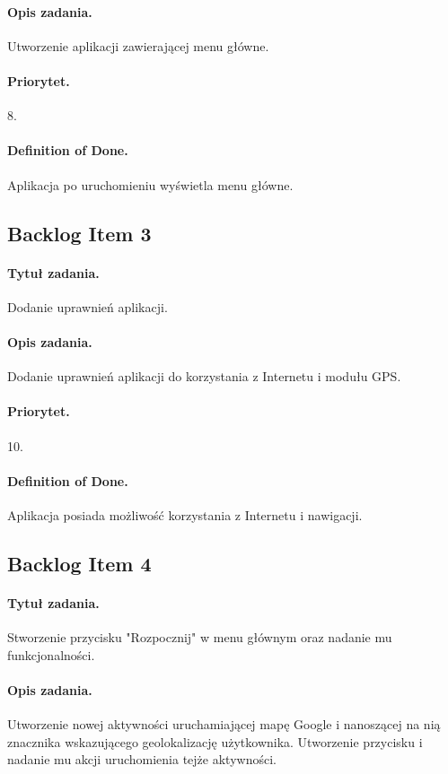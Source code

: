 \documentclass[a4paper]{article}
\begin{document}
\paragraph{Opis zadania.} Utworzenie aplikacji zawierającej menu główne.
\paragraph{Priorytet.} 8.
\paragraph{Definition of Done.} Aplikacja po uruchomieniu wyświetla menu główne.

\subsection{Backlog Item 3}
\paragraph{Tytuł zadania.} Dodanie uprawnień aplikacji.
\paragraph{Opis zadania.} Dodanie uprawnień aplikacji do korzystania z Internetu i modułu GPS.
\paragraph{Priorytet.} 10.
\paragraph{Definition of Done.} Aplikacja posiada możliwość korzystania z Internetu i nawigacji.

\subsection{Backlog Item 4}
\paragraph{Tytuł zadania.} Stworzenie przycisku "Rozpocznij" w menu głównym oraz nadanie mu funkcjonalności.
\paragraph{Opis zadania.} Utworzenie nowej aktywności uruchamiającej mapę Google i nanoszącej na nią znacznika wskazującego geolokalizację użytkownika. Utworzenie przycisku i nadanie mu akcji uruchomienia tejże aktywności. 
\end{document}
